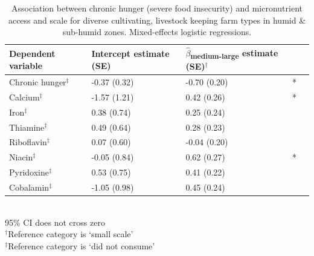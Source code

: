 \begin{table}[H]
  \captionsetup{singlelinecheck = false, justification=justified}
  \caption{
  Association between chronic hunger (severe food insecurity) and micronutrient access and scale for diverse cultivating, livestock keeping farm types in humid \& sub-humid zones. Mixed-effects logistic regressions.
  }
  \label{tab:C_15}
  \small
\begin{tabular}{L{5cm} C{2.5cm} C{2.5cm} C{2cm} C{2cm}}
\toprule
Dependent variable & Intercept estimate (SE) & $\hat{\beta}$\textsubscript{medium-large} estimate (SE)$^{\dag}$ &  \\
\midrule
Chronic hunger$^{\ddag}$ & -0.37 (0.32) & -0.70 (0.20) & * \\
Calcium$^{\ddag}$ & -1.57 (1.21) & 0.42 (0.26) & * \\
Iron$^{\ddag}$ & 0.38 (0.74) & 0.25 (0.24) & \\
Thiamine$^{\ddag}$ & 0.49 (0.64) & 0.28 (0.23) & \\
Riboflavin$^{\ddag}$ & 0.07 (0.60) & -0.04 (0.20) &  \\
Niacin$^{\ddag}$ & -0.05 (0.84) & 0.62 (0.27) & * \\
Pyridoxine$^{\ddag}$ & 0.53 (0.75) & 0.41 (0.22) &  \\
Cobalamin$^{\ddag}$ & -1.05 (0.98) & 0.45 (0.24) &  \\
\bottomrule
\end{tabular}
\footnotesize
\raggedright
\\
95\% CI does not cross zero \\
$^{\dag}$Reference category is `small scale' \\
$^{\ddag}$Reference category is `did not consume'
\end{table}


